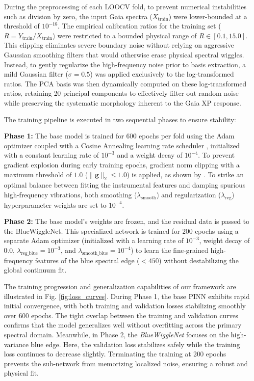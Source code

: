 \documentclass{aa}
\begin{document}
During the preprocessing of each LOOCV fold, to prevent numerical instabilities such as division by zero, the input Gaia spectra ($X_{\text{train}}$) were lower-bounded at a threshold of $10^{-16}$. The empirical calibration ratios for the training set ($R = Y_{\text{train}} / X_{\text{train}}$) were restricted to a bounded physical range of $R \in [0.1, 15.0]$. This clipping eliminates severe boundary noise without relying on aggressive Gaussian smoothing filters that would otherwise erase physical spectral wiggles. Instead, to gently regularize the high-frequency noise prior to basis extraction, a mild Gaussian filter ($\sigma = 0.5$) was applied exclusively to the log-transformed ratios. The PCA basis was then dynamically computed on these log-transformed ratios, retaining 20 principal components to effectively filter out random noise while preserving the systematic morphology inherent to the Gaia XP response.

The training pipeline is executed in two sequential phases to ensure stability:

\textbf{Phase 1:} The base model is trained for 600 epochs per fold using the Adam optimizer \citep{kingma2014adam} coupled with a Cosine Annealing learning rate scheduler \citep{loshchilov2016sgdr}, initialized with a constant learning rate of $10^{-3}$ and a weight decay of $10^{-4}$. To prevent gradient explosion during early training epochs, gradient norm clipping with a maximum threshold of $1.0$ ($\|\mathbf{g}\|_2 \le 1.0$) is applied, as shown by \citet{pascanu2013difficulty}. To strike an optimal balance between fitting the instrumental features and damping spurious high-frequency vibrations, both smoothing ($\lambda_{\text{smooth}}$) and regularization ($\lambda_{\text{reg}}$) hyperparameter weights are set to $10^{-4}$.

\textbf{Phase 2:} The base model's weights are frozen, and the residual data is passed to the BlueWiggleNet. This specialized network is trained for 200 epochs using a separate Adam optimizer (initialized with a learning rate of $10^{-3}$, weight decay of $0.0$, $\lambda_{\text{reg\_blue}} = 10^{-3}$, and $\lambda_{\text{smooth\_blue}} = 10^{-4}$) to learn the fine-grained high-frequency features of the blue spectral edge ($< 450$) without destabilizing the global continuum fit.

The training progression and generalization capabilities of our framework are illustrated in Fig. \ref{fig:loss_curves}. During Phase 1, the base PINN exhibits rapid initial convergence, with both training and validation losses stabilizing smoothly over 600 epochs. The tight overlap between the training and validation curves confirms that the model generalizes well without overfitting across the primary spectral domain. Meanwhile, in Phase 2, the \textit{BlueWiggleNet} focuses on the high-variance blue edge. Here, the validation loss stabilizes safely while the training loss continues to decrease slightly. Terminating the training at 200 epochs prevents the sub-network from memorizing localized noise, ensuring a robust and physical fit.
\end{document}
